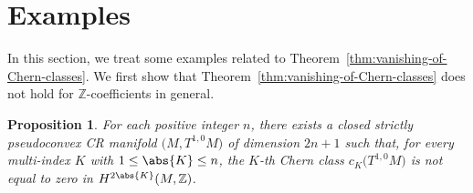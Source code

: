 \documentclass[10pt,a4paper]{amsart}
\numberwithin{equation}{section}
\newtheorem{Proposition}[Theorem]{Proposition}
 { \theoremstyle{definition}
\newtheorem{Remark}[Theorem]{Remark} }
\begin{document}
\section{Examples} \label{section:examples}

In this section, we treat some examples related to Theorem~\ref{thm:vanishing-of-Chern-classes}. We first show that Theorem~\ref{thm:vanishing-of-Chern-classes} does not hold for $\mathbb{Z}$-coefficients in general.

\begin{Proposition} \label{prop:non-vanishing-torsion} For each positive integer $n$, there exists a closed strictly pseudoconvex CR manifold $\big(M,T^{1,0} M\big)$ of dimension $2 n + 1$ such that, for every multi-index $K$ with $1 \leq \abs{K} \leq n$, the $K$-th Chern class $c_{K}\big(T^{1,0}M\big)$ is not equal to zero in $H^{2 \abs{K}}(M, \mathbb{Z})$.
\end{Proposition}
\end{document}
